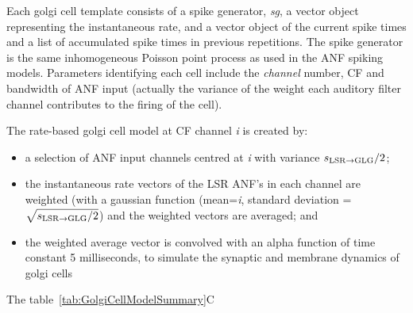 Each golgi cell template consists of a spike generator, \emph{sg}, a
vector object representing the instantaneous rate, and a vector object
of the current spike times and a list of accumulated spike times in
previous repetitions.  The spike generator is the same inhomogeneous
Poisson point process as used in the ANF spiking models.  Parameters
identifying each cell include the \emph{channel} number, CF and
bandwidth of ANF input (actually the variance of the weight each
auditory filter channel contributes to the firing of the cell).

The rate-based golgi cell model at CF channel \emph{i} is created by:
\begin{itemize}
\item a selection of ANF input channels centred at \emph{i} with
  variance $\protect s_{\protect\textrm{{LSR}}\to\textrm{{GLG}}}/2$;
\item the instantaneous rate vectors of the LSR ANF's in each channel
  are weighted (with a gaussian function (mean=\emph{i}, standard
  deviation = $\sqrt{\protect s_{\protect\textrm{{LSR}}\to\textrm{{GLG}}}/2}$) and the weighted vectors are
  averaged; and
\item the weighted average vector is convolved with an alpha function
  of time constant 5 milliseconds, to simulate the synaptic and
  membrane dynamics of golgi cells
\end{itemize}
\noindent The table~\ref{tab:GolgiCellModelSummary}C







